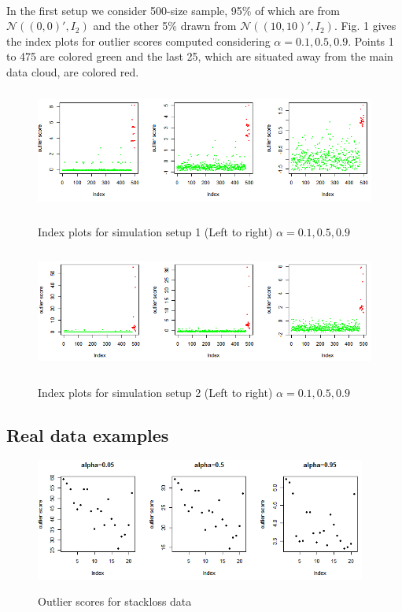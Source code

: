 \documentclass[10pt]{article}
\begin{document}
\paragraph{}In the first setup we consider 500-size sample, 95\% of which are from $\mathcal{N}((0,0)',I_2)$ and the other 5\% drawn from $\mathcal{N}((10,10)',I_2)$. Fig. 1 gives the index plots for outlier scores computed considering $\alpha = 0.1, 0.5, 0.9$. Points 1 to 475 are colored green and the last 25, which are situated away from the main data cloud, are colored red.

\begin{figure}[t]
	\centering
		\includegraphics[height=4cm]{outlier_sim1.png}\\
	\label{fig:fig1}
	\caption{Index plots for simulation setup 1 (Left to right) $\alpha = 0.1, 0.5, 0.9$}
\end{figure}

\begin{figure}[t]
	\centering
		\includegraphics[height=4cm]{outlier_sim2.png}\\
	\label{fig:fig2}
	\caption{Index plots for simulation setup 2 (Left to right) $\alpha = 0.1, 0.5, 0.9$}
\end{figure}

\subsection{Real data examples}

\begin{figure}[t]
	\centering
		\includegraphics[height=4cm]{outlier_stackloss.png}\\
	\label{fig:fig3}
	\caption{Outlier scores for stackloss data}
\end{figure}
\end{document}
